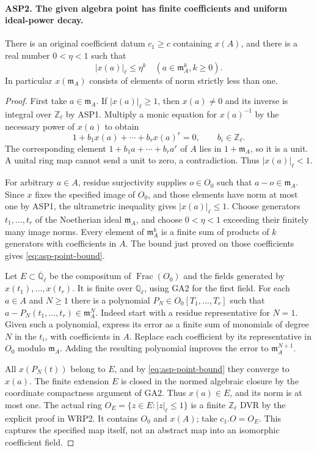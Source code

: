 \documentclass[11pt,a4paper]{article}
\numberwithin{equation}{section}
\theoremstyle{remark}\newtheorem{remark}[theorem]{Remark}
\begin{document}
\paragraph{ASP2. The given algebra point has finite coefficients and uniform ideal-power decay.}
\label{claim:ASP2}
There is an original coefficient datum $c_1\geq c$
containing $x(A)$, and there is a real number
$0<\eta<1$ such that
\begin{equation}\label{eq:asp-point-bound}
            |x(a)|_\ell\leq\eta^k
                  \quad(a\in\mathfrak m_A^k, k\geq0).
\end{equation}
In particular $x(\mathfrak m_A)$ consists of elements
of norm strictly less than one.
\begin{proof}
First take $a\in\mathfrak m_A$.  If $|x(a)|_\ell\geq1$,
then $x(a)\ne0$ and its inverse is integral over
$\mathbb Z_\ell$ by ASP1.  Multiply a monic equation
for $x(a)^{-1}$ by the necessary power of $x(a)$ to obtain
\[
             1+b_1x(a)+\cdots+b_rx(a)^r=0,
                                  \qquad b_i\in\mathbb Z_\ell.
\]
The corresponding element $1+b_1a+\cdots+b_ra^r$ of
$A$ lies in $1+\mathfrak m_A$, so it is a unit.  A
unital ring map cannot send a unit to zero, a
contradiction.  Thus $|x(a)|_\ell<1$.

For arbitrary $a\in A$, residue surjectivity supplies
$o\in O_0$ such that $a-o\in\mathfrak m_A$.  Since
$x$ fixes the specified image of $O_0$, and those
elements have norm at most one by ASP1, the
ultrametric inequality gives $|x(a)|_\ell\leq1$.
Choose generators $t_1,\ldots,\allowbreak{} t_r$ of the Noetherian
ideal $\mathfrak m_A$, and choose
$0<\eta<1$ exceeding their finitely many image norms.
Every element of $\mathfrak m_A^k$ is a finite sum
of products of $k$ generators with coefficients in
$A$.  The bound just proved on those coefficients
gives \eqref{eq:asp-point-bound}.

Let $E\subset\overline{\mathbb Q}_\ell$ be the
compositum of $\operatorname{Frac}(O_0)$ and the fields
generated by $x(t_1),\ldots,\allowbreak{} x(t_r)$.  It is finite
over $\mathbb Q_\ell$, using GA2 for the first field.
For each $a\in A$ and $N\geq1$ there is a polynomial
$P_N\in O_0[T_1,\ldots,\allowbreak{} T_r]$ such that
$a-P_N(t_1,\ldots,\allowbreak{} t_r)\in\mathfrak m_A^N$.
Indeed start with a residue representative for $N=1$.
Given such a polynomial, express its error as a finite
sum of monomials of degree $N$ in the $t_i$, with
coefficients in $A$.  Replace each coefficient by
its representative in $O_0$ modulo $\mathfrak m_A$.
Adding the resulting polynomial improves the error
to $\mathfrak m_A^{N+1}$.

All $x(P_N(t))$ belong to $E$, and by
\eqref{eq:asp-point-bound} they converge to $x(a)$.
The finite extension $E$ is closed in the normed
algebraic closure by the coordinate compactness
argument of GA2.  Thus $x(a)\in E$, and its norm is
at most one.  The actual ring
$O_E=\{z\in E:|z|_\ell\leq1\}$ is a finite
$\mathbb Z_\ell$ DVR by the explicit proof in WRP2.
It contains $O_0$ and $x(A)$; take $c_1.O=O_E$.
This captures the specified map itself, not an
abstract map into an isomorphic coefficient field.
\end{proof}
\end{document}

